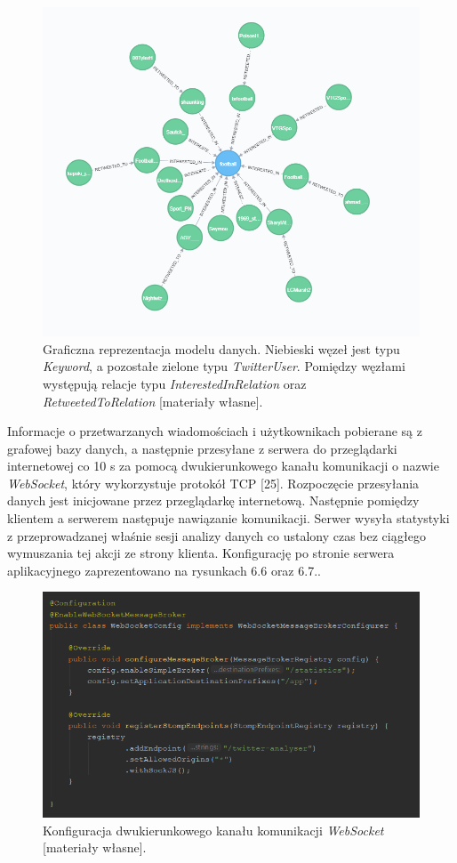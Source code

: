 \begin{figure}[h] %
	\centering
	\includegraphics[width=1.0\linewidth]{img/big_data_neo4j}
	\caption{Graficzna reprezentacja modelu danych. Niebieski węzeł jest typu \textit{Keyword}, a pozostałe zielone typu \textit{TwitterUser}. Pomiędzy węzłami występują relacje typu \textit{InterestedInRelation} oraz \textit{RetweetedToRelation} [materiały własne].}
\end{figure}

Informacje o przetwarzanych wiadomościach i użytkownikach pobierane są z grafowej bazy danych, a następnie przesyłane z serwera do przeglądarki internetowej co 10 s za pomocą dwukierunkowego kanału komunikacji o nazwie \textit{WebSocket}, który wykorzystuje protokół TCP [25]. Rozpoczęcie przesyłania danych jest inicjowane przez przeglądarkę internetową. Następnie pomiędzy klientem a serwerem następuje nawiązanie komunikacji. Serwer wysyła statystyki z przeprowadzanej właśnie sesji analizy danych co ustalony czas bez ciągłego wymuszania tej akcji ze strony klienta. Konfigurację po stronie serwera aplikacyjnego zaprezentowano na rysunkach 6.6 oraz 6.7..

\begin{figure}[h] %
	\centering
	\includegraphics[width=1.0\linewidth]{img/twitter_analyser_websocket_configuration_2}
	\caption{Konfiguracja dwukierunkowego kanału komunikacji \textit{WebSocket} [materiały własne].}
\end{figure}

